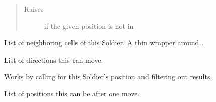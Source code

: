 \documentclass[letterpaper,10pt,english,openany,oneside]{sphinxmanual}
\begin{document}
\begin{fulllineitems}
\begin{fulllineitems}
\begin{quote}
\begin{description}
\item[{Raises}] \leavevmode
{} \textendash{} if the given position is not in {\hyperref[\detokenize{neutron:neutron.Soldier.possible_moves}]{}}

\end{description}\end{quote}

\end{fulllineitems}


\begin{fulllineitems}
\label{\detokenize{neutron:neutron.Soldier.neighbors}}
List of neighboring cells of this Soldier. A thin wrapper around
{\hyperref[\detokenize{neutron:neutron.NeutronBoard.neighbors}]{}}.

\end{fulllineitems}


\begin{fulllineitems}
\label{\detokenize{neutron:neutron.Soldier.possible_directions}}
List of directions this {\hyperref[\detokenize{neutron:neutron.Soldier}]{}} can move.

Works by calling {\hyperref[\detokenize{neutron:neutron.NeutronBoard.furthest_empty_spot}]{}} for this
Soldier’s position and filtering out  results.

\end{fulllineitems}


\begin{fulllineitems}
\label{\detokenize{neutron:neutron.Soldier.possible_moves}}
List of positions this {\hyperref[\detokenize{neutron:neutron.Soldier}]{}} can be after one move.


\end{fulllineitems}
\end{fulllineitems}
\end{document}
